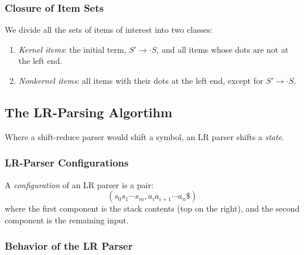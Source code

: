 \documentclass[12pt,a4paper,twoside,openany]{book}
\begin{document}
\subsubsection{Closure of Item Sets}

We divide all the sets of items of interest into two classes:
\begin{enumerate}
    \item \textit{Kernel items}: the initial term, $S'\rightarrow\cdot S$, and all items whose dots are not at the left end.
    \item \textit{Nonkernel items}: all items with their dots at the left end, except for $S'\rightarrow\cdot S$.
\end{enumerate}

\subsection{The LR-Parsing Algortihm}

Where a shift-reduce parser would shift a symbol, an LR parser shifts a \textit{state}.

\subsubsection{LR-Parser Configurations}

A \textit{configuration} of an LR parser is a pair: $$(s_0s_1\cdots s_m,a_ia_{i+1}\cdots a_n\$)$$ where the first component is the stack contents (top on the right), and the second component is the remaining input.

\subsubsection{Behavior of the LR Parser}

\end{document}
